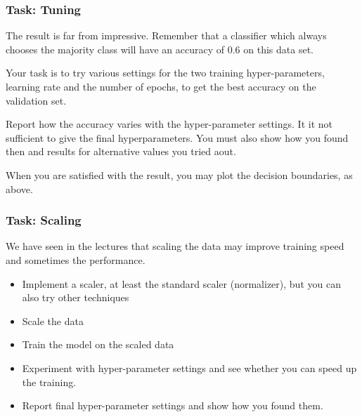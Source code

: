 \documentclass[11pt]{article}
\providecommand{\tightlist}{%
      \setlength{\itemsep}{0pt}\setlength{\parskip}{0pt}}
\begin{document}
    \hypertarget{task-tuning}{%
\subsubsection{Task: Tuning}\label{task-tuning}}

The result is far from impressive. Remember that a classifier which
always chooses the majority class will have an accuracy of 0.6 on this
data set.

Your task is to try various settings for the two training
hyper-parameters, learning rate and the number of epochs, to get the
best accuracy on the validation set.

Report how the accuracy varies with the hyper-parameter settings. It it
not sufficient to give the final hyperparameters. You must also show how
you found then and results for alternative values you tried aout.

When you are satisfied with the result, you may plot the decision
boundaries, as above.

    \hypertarget{task-scaling}{%
\subsubsection{Task: Scaling}\label{task-scaling}}

    We have seen in the lectures that scaling the data may improve training
speed and sometimes the performance.

\begin{itemize}
\tightlist
\item
  Implement a scaler, at least the standard scaler (normalizer), but you
  can also try other techniques
\item
  Scale the data
\item
  Train the model on the scaled data
\item
  Experiment with hyper-parameter settings and see whether you can speed
  up the training.
\item
  Report final hyper-parameter settings and show how you found them.
\end{itemize}
\end{document}

